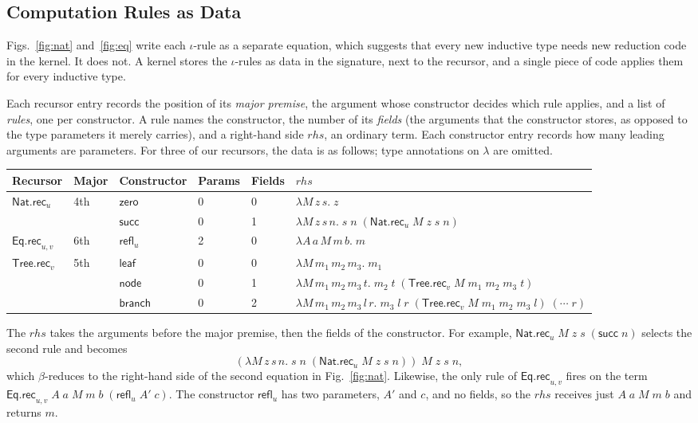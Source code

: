 \documentclass[acmsmall,screen,nonacm]{acmart}
\newcommand{\zero}{\mathsf{zero}}
\newcommand{\tsucc}{\mathsf{succ}}
\newcommand{\NatRec}[1]{\mathsf{Nat.rec}_{#1}}
\newcommand{\refl}[1]{\mathsf{refl}_{#1}}
\newcommand{\EqRecDep}[1]{\mathsf{Eq.rec}_{#1}}
\begin{document}
\subsection{Computation Rules as Data}
\label{sec:iota-data}

Figs.~\ref{fig:nat} and~\ref{fig:eq} write each $\iota$-rule as a separate equation, which suggests that every new inductive type needs new reduction code in the kernel.
It does not.
A kernel stores the $\iota$-rules as data in the signature, next to the recursor, and a single piece of code applies them for every inductive type.

Each recursor entry records the position of its \emph{major premise}, the argument whose constructor decides which rule applies,
and a list of \emph{rules}, one per constructor.
A rule names the constructor, the number of its \emph{fields} (the arguments that the constructor stores, as opposed to the type parameters it merely carries),
and a right-hand side $\mathit{rhs}$, an ordinary term.
Each constructor entry records how many leading arguments are parameters.
For three of our recursors, the data is as follows; type annotations on $\lambda$ are omitted.
\begin{center}
\footnotesize
\renewcommand{\arraystretch}{1.3}
\begin{tabular}{@{}llllll@{}}
\toprule
\textbf{Recursor} & \textbf{Major} & \textbf{Constructor} & \textbf{Params} & \textbf{Fields} & $\mathit{rhs}$ \\
\midrule
$\NatRec{u}$ & 4th & $\zero$ & 0 & 0 & $\lambda M\,z\,s.\; z$ \\
& & $\tsucc$ & 0 & 1 & $\lambda M\,z\,s\,n.\; s\;n\;(\NatRec{u}\;M\;z\;s\;n)$ \\
$\EqRecDep{u,v}$ & 6th & $\refl{u}$ & 2 & 0 & $\lambda A\,a\,M\,m\,b.\; m$ \\
$\mathsf{Tree.rec}_v$ & 5th & $\mathsf{leaf}$ & 0 & 0 & $\lambda M\,m_1\,m_2\,m_3.\; m_1$ \\
& & $\mathsf{node}$ & 0 & 1 & $\lambda M\,m_1\,m_2\,m_3\,t.\; m_2\;t\;(\mathsf{Tree.rec}_v\;M\;m_1\;m_2\;m_3\;t)$ \\
& & $\mathsf{branch}$ & 0 & 2 & $\lambda M\,m_1\,m_2\,m_3\,l\,r.\; m_3\;l\;r\;(\mathsf{Tree.rec}_v\;M\;m_1\;m_2\;m_3\;l)\;(\cdots\;r)$ \\
\bottomrule
\end{tabular}
\end{center}
The $\mathit{rhs}$ takes the arguments before the major premise, then the fields of the constructor.
For example, $\NatRec{u}\;M\;z\;s\;(\tsucc\;n)$ selects the second rule and becomes
\[
(\lambda M\,z\,s\,n.\; s\;n\;(\NatRec{u}\;M\;z\;s\;n))\;M\;z\;s\;n,
\]
which $\beta$-reduces to the right-hand side of the second equation in Fig.~\ref{fig:nat}.
Likewise, the only rule of $\EqRecDep{u,v}$ fires on the term $\EqRecDep{u,v}\;A\;a\;M\;m\;b\;(\refl{u}\;A'\;c)$.
The constructor $\refl{u}$ has two parameters, $A'$ and $c$, and no fields,
so the $\mathit{rhs}$ receives just $A\;a\;M\;m\;b$ and returns $m$.
\end{document}
